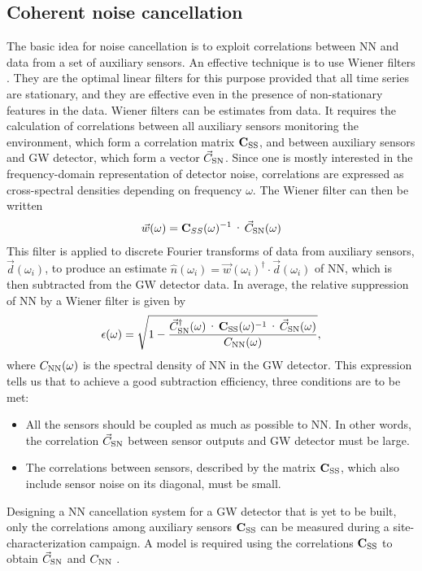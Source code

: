 \subsection{Coherent noise cancellation}
\label{sub:Wiener}
The basic idea for noise cancellation is to exploit correlations between NN and data from a set of auxiliary sensors. An effective technique is to use Wiener filters \cite{Orf2007}. They are the optimal linear filters for this purpose provided that all time series are stationary, and they are effective even in the presence of non-stationary features in the data. Wiener filters can be estimates from data. It requires the calculation of correlations between all auxiliary sensors monitoring the environment, which form a correlation matrix $\mathbf C_{\rm SS}$, and between auxiliary sensors and GW detector, which form a vector $\vec C_{\rm SN}$. Since one is mostly interested in the frequency-domain representation of detector noise, correlations are expressed as cross-spectral densities depending on frequency $\omega$. The Wiener filter can then be written
\begin{eqnarray}
		\vec w(\omega)=\mathbf C_{SS}(\omega)^{-1}\cdot\vec C_{\rm SN}(\omega)
		\label{eq:Wiener}
\end{eqnarray}
This filter is applied to discrete Fourier transforms of data from auxiliary sensors, $\vec d(\omega_i)$, to produce an estimate $\hat n(\omega_i)=\vec w(\omega_i)^\dagger\cdot \vec d(\omega_i)$ of NN, which is then subtracted from the GW detector data. In average, the relative suppression of NN by a Wiener filter is given by
\begin{eqnarray}
		\epsilon(\omega)=\sqrt{1-\frac{\vec C^\dagger_{\rm SN}(\omega)\cdot \mathbf C_{\rm SS}(\omega)^{-1}\cdot\vec C_{\rm SN}(\omega)}{C_{\rm NN}(\omega)}},
		\label{eq:residual}
\end{eqnarray}
where $C_{\rm NN}(\omega)$ is the spectral density of NN in the GW detector. This expression tells us that to achieve a good subtraction efficiency, three conditions are to be met:
\begin{itemize}
\item All the sensors should be coupled as much as possible to NN. In other words, the correlation $\vec C_{\rm SN}$ between sensor outputs and GW detector must be large.
\item The correlations between sensors, described by the matrix $\mathbf C_{\rm SS}$, which also include sensor noise on its diagonal, must be small.
\end{itemize}
Designing a NN cancellation system for a GW detector that is yet to be built, only the correlations among auxiliary sensors $\mathbf C_{\rm SS}$ can be measured during a site-characterization campaign. A model is required using the correlations $\mathbf C_{\rm SS}$ to obtain $\vec C_{\rm SN}$ and $C_{\rm NN}$ \cite{CoEA2016a}.

